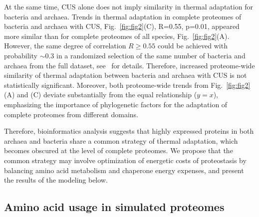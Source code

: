 \documentclass[10pt,letterpaper]{article}
\begin{document}
At the same time, CUS alone does not imply similarity in thermal adaptation for bacteria and archaea. Trends in thermal adaptation in complete proteomes of bacteria and archaea with CUS, Fig.~\ref{fig:fig2}(C), R=0.55, p=0.01, appeared more similar than for complete proteomes of all species, Fig.~\ref{fig:fig2}(A). However, the same degree of correlation $R\geq 0.55$ could be achieved with probability $\sim 0.3$ in a randomized selection of the same number of bacteria and archaea from the full dataset, see~ for details. Therefore, increased proteome-wide similarity of thermal adaptation between bacteria and archaea with CUS is not statistically significant. Moreover, both proteome-wide trends from Fig.~\ref{fig:fig2}(A) and (C) deviate substantially from the equal relationship ($y=x$), emphasizing the importance of phylogenetic factors for the adaptation of complete proteomes from different domains. 

Therefore, bioinformatics analysis suggests that highly expressed proteins in both archaea and bacteria share a common strategy of thermal adaptation, which becomes obscured at the level of complete proteomes. We propose that the common strategy may involve optimization of energetic costs of proteostasis by balancing amino acid metabolism and chaperone energy expenses, and present the results of the modeling below. 

\subsection*{Amino acid usage in simulated proteomes}
\end{document}
